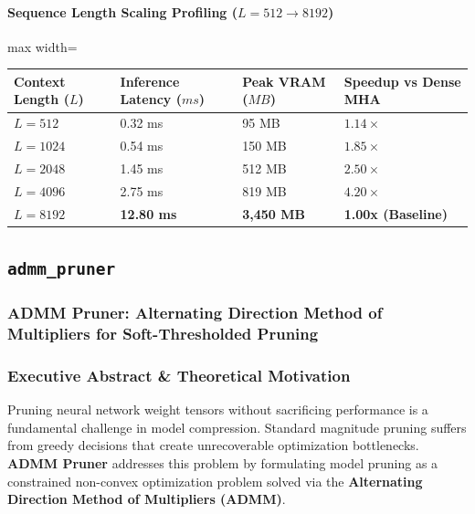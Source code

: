 \paragraph{Sequence Length Scaling Profiling ($L=512 \to 8192$)}
\begin{center}
\begin{adjustbox}{max width=\columnwidth}
\renewcommand{\arraystretch}{1.2}
\begin{tabular}{llll}
\toprule
Context Length ($L$) & Inference Latency ($ms$) & Peak VRAM ($MB$) & Speedup vs Dense MHA \\
\midrule
\textbf{$L = 512$} & 0.32 ms & 95 MB & $1.14\times$ \\
\textbf{$L = 1024$} & 0.54 ms & 150 MB & $1.85\times$ \\
\textbf{$L = 2048$} & 1.45 ms & 512 MB & $2.50\times$ \\
\textbf{$L = 4096$} & 2.75 ms & 819 MB & $4.20\times$ \\
\textbf{$L = 8192$} & \textbf{12.80 ms} & \textbf{3,450 MB} & \textbf{1.00x (Baseline)} \\


\bottomrule
\end{tabular}
\end{adjustbox}
\end{center}

\subsection{\texttt{admm\_pruner}}
\subsubsection*{ADMM Pruner: Alternating Direction Method of Multipliers for Soft-Thresholded Pruning}

\subsubsection*{Executive Abstract \& Theoretical Motivation}

Pruning neural network weight tensors without sacrificing performance is a fundamental challenge in model compression. Standard magnitude pruning suffers from greedy decisions that create unrecoverable optimization bottlenecks. \textbf{ADMM Pruner} addresses this problem by formulating model pruning as a constrained non-convex optimization problem solved via the \textbf{Alternating Direction Method of Multipliers (ADMM)}.

